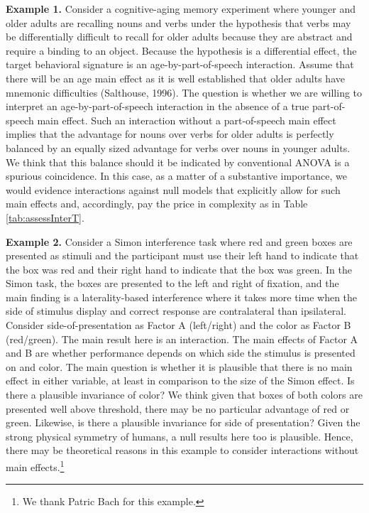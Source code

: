 \documentclass[
  english,
  ,man]{apa6}
\begin{document}
\textbf{Example 1.} Consider a cognitive-aging memory experiment where younger and older adults are recalling nouns and verbs under the hypothesis that verbs may be differentially difficult to recall for older adults because they are abstract and require a binding to an object. Because the hypothesis is a differential effect, the target behavioral signature is an age-by-part-of-speech interaction. Assume that there will be an age main effect as it is well established that older adults have mnemonic difficulties (Salthouse, 1996). The question is whether we are willing to interpret an age-by-part-of-speech interaction in the absence of a true part-of-speech main effect. Such an interaction without a part-of-speech main effect implies that the advantage for nouns over verbs for older adults is perfectly balanced by an equally sized advantage for verbs over nouns in younger adults. We think that this balance should it be indicated by conventional ANOVA is a spurious coincidence. In this case, as a matter of a substantive importance, we would evidence interactions against null models that explicitly allow for such main effects and, accordingly, pay the price in complexity as in Table \ref{tab:assessInterT}.

\textbf{Example 2.} Consider a Simon interference task where red and green boxes are presented as stimuli and the participant must use their left hand to indicate that the box was red and their right hand to indicate that the box was green. In the Simon task, the boxes are presented to the left and right of fixation, and the main finding is a laterality-based interference where it takes more time when the side of stimulus display and correct response are contralateral than ipsilateral. Consider side-of-presentation as Factor A (left/right) and the color as Factor B (red/green). The main result here is an interaction. The main effects of Factor A and B are whether performance depends on which side the stimulus is presented on and color. The main question is whether it is plausible that there is no main effect in either variable, at least in comparison to the size of the Simon effect. Is there a plausible invariance of color? We think given that boxes of both colors are presented well above threshold, there may be no particular advantage of red or green. Likewise, is there a plausible invariance for side of presentation? Given the strong physical symmetry of humans, a null results here too is plausible. Hence, there may be theoretical reasons in this example to consider interactions without main effects.\footnote{We thank Patric Bach for this example.}
\end{document}
